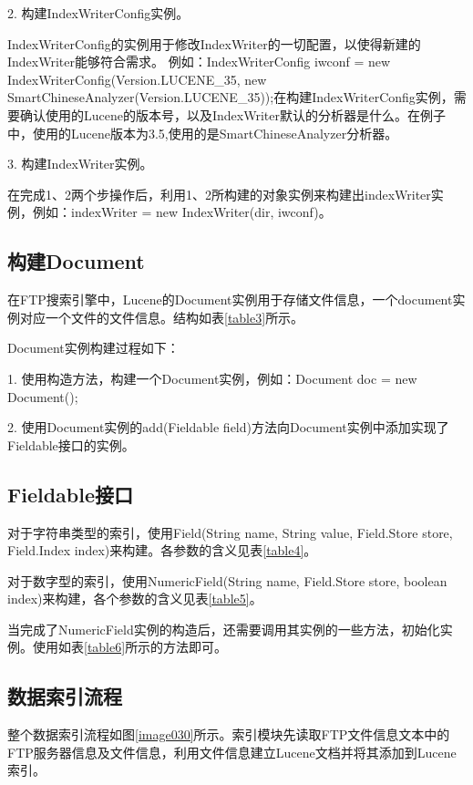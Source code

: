 2. 构建IndexWriterConfig实例。

IndexWriterConfig的实例用于修改IndexWriter的一切配置，以使得新建的Index\-Writer能够符合需求。
例如：IndexWriterConfig iwconf = new IndexWriter\-Config\-(Version.\-LUCENE\_35, new Smart\-Chinese\-Analyzer(Version.LUCENE\_35));在构建Index\-Writer\-Config实例，需要确认使用的Lucene的版本号，以及Index\-Writer默认的分析器是什么。在例子中，使用的Lucene版本为3.5,使用的是SmartChineseAnalyzer分析器。

3. 构建IndexWriter实例。

在完成1、2两个步操作后，利用1、2所构建的对象实例来构建出indexWriter实例，例如：indexWriter = new IndexWriter(dir, iwconf)。
\subsection{构建Document}
在FTP搜索引擎中，Lucene的Document实例用于存储文件信息，一个document实例对应一个文件的文件信息。结构如表\ref{table3}所示。
\newpage
{}

Document实例构建过程如下：

1. 使用构造方法，构建一个Document实例，例如：Document doc = new Document();

2. 使用Document实例的add(Fieldable field)方法向Document实例中添加实现了Fieldable接口的实例。
\subsection{Fieldable接口}
对于字符串类型的索引，使用Field(String name, String value, Field.Store store, Field.Index index)来构建。各参数的含义见表\ref{table4}。

\newpage
对于数字型的索引，使用NumericField(String name, Field.Store store, boolean index)来构建，各个参数的含义见表\ref{table5}。


当完成了NumericField实例的构造后，还需要调用其实例的一些方法，初始化实例。使用如表\ref{table6}所示的方法即可。


\subsection{数据索引流程}
整个数据索引流程如图\ref{image030}所示。索引模块先读取FTP文件信息文本中的FTP服务器信息及文件信息，利用文件信息建立Lucene文档并将其添加到Lucene索引。
\newpage
{}

